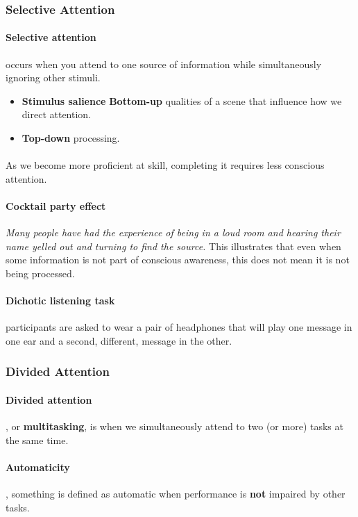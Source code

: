 \documentclass{article}
\begin{document}
	\subsubsection{Selective Attention}
	\paragraph{Selective attention} occurs when you attend to one source of information while simultaneously ignoring other stimuli. 
	\begin{itemize}
		\item \textbf{Stimulus salience} \textbf{Bottom-up} qualities of a scene that influence how we direct attention.
		\item \textbf{Top-down} processing.
	\end{itemize}
	\paragraph{} As we become more proficient at skill, completing it requires less conscious attention.
	\paragraph{Cocktail party effect} \emph{Many people have had the experience of being in a loud room and hearing their name yelled out and turning to find the source.} This illustrates that even when some information is not part of conscious awareness, this does not mean it is not being processed.
	\paragraph{Dichotic listening task} participants are asked to wear a pair of headphones that will play one message in one ear and a second, different, message in the other.
	\subsubsection{Divided Attention}
	\paragraph{Divided attention}, or \textbf{multitasking}, is when we simultaneously attend to two (or more) tasks at the same time.
	\paragraph{Automaticity}, something is defined as automatic when performance is \textbf{not} impaired by other tasks.
\end{document}
